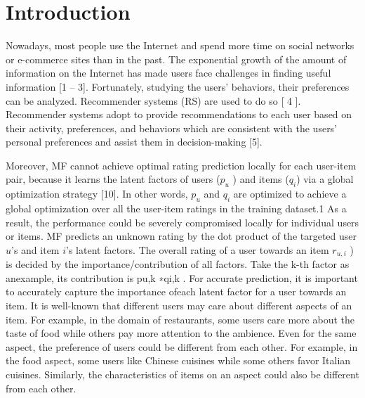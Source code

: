 \documentclass[10pt,conference]{IEEEtran}
\begin{document}
\section{Introduction}


Nowadays, most people use the Internet and spend more time on social networks or e-commerce
sites than in the past. The exponential growth of the amount of information on the Internet has
made users face challenges in finding useful information [1 – 3]. Fortunately, studying the users’
behaviors, their preferences can be analyzed. Recommender systems (RS) are used to do so [ 4 ].
Recommender systems adopt to provide recommendations to each user based on their activity,
preferences, and behaviors which are consistent with the users’ personal preferences and assist them
in decision-making [5].


Moreover, MF cannot achieve optimal rating prediction locally for each user-item pair, because it learns the latent factors of users ($p_u$ ) and items ($q_i$) via a global optimization strategy [10]. In other words, $p_u$ and $q_i$ are optimized to achieve a global optimization over all the user-item ratings in the training dataset.1 As a result, the performance could be severely compromised locally for individual users or items. MF predicts an unknown rating by the dot product of the targeted user $u$'s and item $i$'s latent factors. The overall rating of a user towards an item $r_{u,i}$ ) is decided by the importance/contribution of all factors. Take the k-th factor as anexample, its contribution is pu,k ∗qi,k . For accurate prediction, it is important to accurately capture the importance ofeach latent factor for a user towards an item. It is well-known that different users may care about different aspects of an item. For example, in the domain of restaurants, some users care more about the taste of food while others pay more attention to the ambience. Even for the same aspect, the preference of users could be different from each other. For example, in the food aspect, some users like Chinese cuisines while some others favor Italian cuisines. Similarly, the characteristics of items on an aspect could also be different from each other.
\cite{linden2003amazon}
\end{document}
